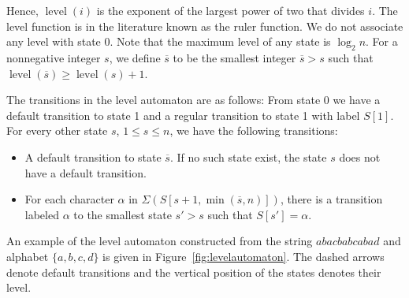 \documentclass[a4paper,11pt]{article}
\DeclareMathOperator{\level}{level}
\begin{document}
Hence, $\level(i)$ is the exponent of the largest power of two that divides $i$. The level function is in the literature known as the ruler function. 
We do not associate any level with state 0. Note that the maximum level of any state is $\log_2 n$.
For a nonnegative integer $s$, we define $\overline{s}$ to be the smallest integer $\overline{s} > s$ such that $\level(\overline{s}) \geq \level(s) +1$. 

The transitions in the level automaton are as follows:
From state 0 we have a default transition to state 1 and a regular transition to state 1 with label $S[1]$. For every other state $s$, $1 \leq s \leq n$, we have the following transitions:
\begin{itemize}
\item A default transition to state $\overline{s}$. If no such state exist, the state $s$ does not have a default transition.
\item For each character $\alpha$ in $\Sigma(S[s + 1, \min(\overline{s}, n)])$, there is a transition labeled $\alpha$ to the smallest state $s' > s$ such that $S[s']= \alpha$.
\end{itemize}
An example of the level automaton constructed from the string $abacbabcabad$ and alphabet $\{a,b,c,d\}$ is given in Figure~\ref{fig:levelautomaton}. The dashed arrows denote default transitions and the vertical position of the states denotes their level.
\end{document}
